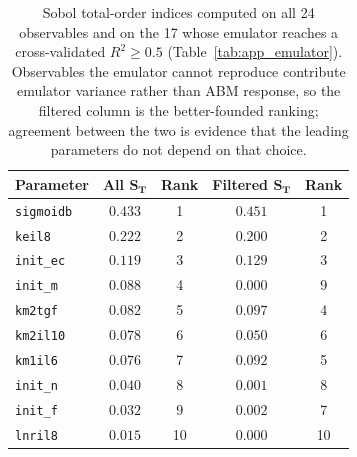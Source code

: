 \begin{table}[h]
\centering\footnotesize
\caption{Sobol total-order indices computed on all 24 observables and on the 17 whose emulator reaches a cross-validated $R^2 \geq 0.5$ (Table~\ref{tab:app_emulator}). Observables the emulator cannot reproduce contribute emulator variance rather than ABM response, so the filtered column is the better-founded ranking; agreement between the two is evidence that the leading parameters do not depend on that choice.}
\label{tab:app_sobol_filtered}
\begin{tabular}{lcccc}
\toprule
\textbf{Parameter} & \textbf{All }$\mathbf{S_T}$ & \textbf{Rank} & \textbf{Filtered }$\mathbf{S_T}$ & \textbf{Rank} \\
\midrule
\texttt{sigmoidb} & $0.433$ & 1 & $0.451$ & 1 \\
\texttt{keil8} & $0.222$ & 2 & $0.200$ & 2 \\
\texttt{init\_ec} & $0.119$ & 3 & $0.129$ & 3 \\
\texttt{init\_m} & $0.088$ & 4 & $0.000$ & 9 \\
\texttt{km2tgf} & $0.082$ & 5 & $0.097$ & 4 \\
\texttt{km2il10} & $0.078$ & 6 & $0.050$ & 6 \\
\texttt{km1il6} & $0.076$ & 7 & $0.092$ & 5 \\
\texttt{init\_n} & $0.040$ & 8 & $0.001$ & 8 \\
\texttt{init\_f} & $0.032$ & 9 & $0.002$ & 7 \\
\texttt{lnril8} & $0.015$ & 10 & $0.000$ & 10 \\
\bottomrule
\end{tabular}
\end{table}

